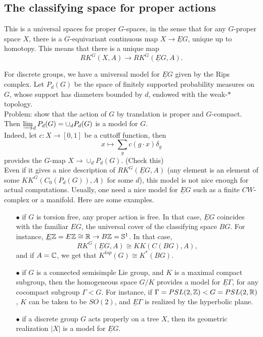 \subsection{The classifying space for proper actions}

This is a universal spaces for proper $G$-spaces, in the sense that for any $G$-proper space $X$, there is a $G$-equivariant continuous map $X\rightarrow \underline EG$, unique up to homotopy. This means that there is a unique map 
\[RK^G(X,A) \rightarrow RK^G(\underline EG,A).\]

For discrete groups, we have a universal model for $\underline EG$ given by the Rips complex. Let $P_d(G)$ be the space of finitely supported probability measures on $G$, whose support has diameters bounded by $d$, endowed with the weak-$*$ topology. \\

Problem: show that the action of $G$ by translation is proper and $G$-compact.\\

Then $\varinjlim_d P_d(G)= \cup_d P_d(G)$ is a model for $G$.\\

Indeed, let $c: X \rightarrow [0,1]$ be a cuttoff function, then 
\[x \mapsto \sum_g c(g\cdot x)\delta_g\]
provides the $G$-map $X\rightarrow \cup_d P_d(G)$. (Check this)\\

Even if it gives a nice description of $RK^G(\underline EG,A)$ (any element is an element of some $KK^G(C_0(P_d(G)),A)$ for some $d$), this model is not nice enough for actual computations. Usually, one need a nice model for $\underline EG$ such as a finite $CW$-complex or a manifold. Here are some examples.

\begin{itemize}
\item[$\bullet$] if $G$ is torsion free, any proper action is free. In that case, $\underline EG$ coincides with the familiar $EG$, the universal cover of the classifying space $BG$. For instance, $\underline E \mathbb Z = E\mathbb Z \cong \mathbb R \rightarrow B\mathbb Z = \mathbb S^1$. In that case, 
\[RK^G(\underline E G,A)\cong KK(C(BG),A),\]
and if $A=\mathbb C$, we get that $K^{top}(G)\cong K^*(BG)$.\\

\item[$\bullet$] if $G$ is a connected semisimple Lie group, and $K$ is a maximal compact subgroup, then the homogeneous space $G/K$ provides a model for $\underline E\Gamma$, for any cocompact subgroup $\Gamma <G$. For instance, if $\Gamma=PSL(2,\mathbb Z)< G =PSL(2,\mathbb R)$, $K$ can be taken to be $SO(2)$, and $\underline E\Gamma$ is realized by the hyperbolic plane.

\item[$\bullet$] if a discrete group $G$ acts properly on a tree $X$, then its geometric realization $|X|$ is a model for $\underline EG$.
\end{itemize}

